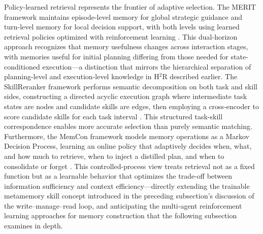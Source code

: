 \documentclass[11pt]{article}
\begin{document}
Policy-learned retrieval represents the frontier of adaptive selection. The MERIT framework maintains episode-level memory for global strategic guidance and turn-level memory for local decision support, with both levels using learned retrieval policies optimized with reinforcement learning \cite{ref135}. This dual-horizon approach recognizes that memory usefulness changes across interaction stages, with memories useful for initial planning differing from those needed for state-conditioned execution---a distinction that mirrors the hierarchical separation of planning-level and execution-level knowledge in H\(^2\)R described earlier. The SkillReranker framework performs semantic decomposition on both task and skill sides, constructing a directed acyclic execution graph where intermediate task states are nodes and candidate skills are edges, then employing a cross-encoder to score candidate skills for each task interval \cite{ref138}. This structured task-skill correspondence enables more accurate selection than purely semantic matching. Furthermore, the MemCon framework models memory operations as a Markov Decision Process, learning an online policy that adaptively decides when, what, and how much to retrieve, when to inject a distilled plan, and when to consolidate or forget \cite{ref139}. This controlled-process view treats retrieval not as a fixed function but as a learnable behavior that optimizes the trade-off between information sufficiency and context efficiency---directly extending the trainable metamemory skill concept introduced in the preceding subsection's discussion of the write--manage--read loop, and anticipating the multi-agent reinforcement learning approaches for memory construction that the following subsection examines in depth.
\end{document}
